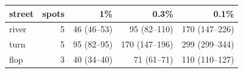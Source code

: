 \begin{tabular}{lrrrr}
\toprule
street & spots & 1\% & 0.3\% & 0.1\% \\ \midrule
river & 5 & 46 (46--53) & 95 (82--110) & 170 (147--226) \\
turn & 5 & 95 (82--95) & 170 (147--196) & 299 (299--344) \\
flop & 3 & 40 (34--40) & 71 (61--71) & 110 (110--127) \\
\bottomrule
\end{tabular}
